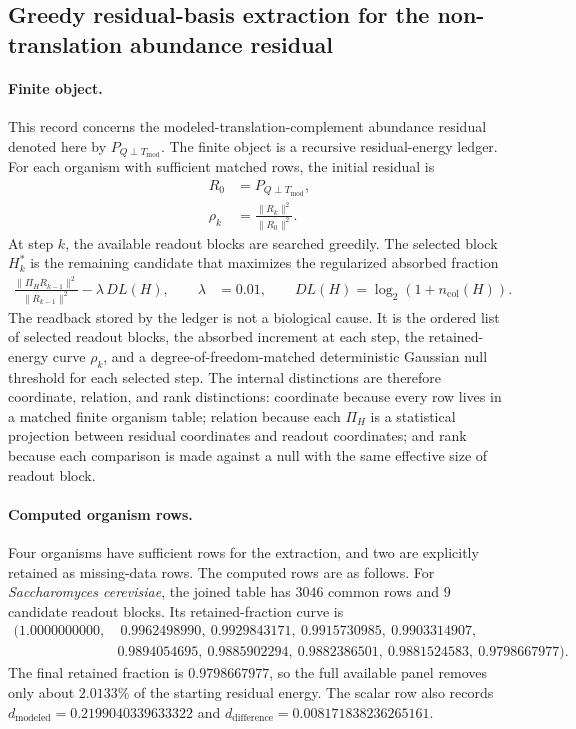 \subsection{Greedy residual-basis extraction for the non-translation abundance residual}
\label{sec:q6-residual-basis-extraction-greedy-readout-cross-layer}

\paragraph{Finite object.}
This record concerns the modeled-translation-complement abundance residual denoted here by $P_{Q\perp T_{\mathrm{mod}}}$.  The finite object is a recursive residual-energy ledger.  For each organism with sufficient matched rows, the initial residual is
$$
\begin{aligned}
R_0 &= P_{Q\perp T_{\mathrm{mod}}},\\
\rho_k &= \frac{\|R_k\|^2}{\|R_0\|^2}.
\end{aligned}
$$
At step $k$, the available readout blocks are searched greedily.  The selected block $H_k^*$ is the remaining candidate that maximizes the regularized absorbed fraction
$$
\begin{aligned}
\frac{\|\Pi_H R_{k-1}\|^2}{\|R_{k-1}\|^2} - \lambda\,DL(H),
\qquad
\lambda &= 0.01,
\qquad
DL(H)=\log_2(1+n_{\mathrm{col}}(H)).
\end{aligned}
$$
The readback stored by the ledger is not a biological cause.  It is the ordered list of selected readout blocks, the absorbed increment at each step, the retained-energy curve $\rho_k$, and a degree-of-freedom-matched deterministic Gaussian null threshold for each selected step.  The internal distinctions are therefore coordinate, relation, and rank distinctions: coordinate because every row lives in a matched finite organism table; relation because each $\Pi_H$ is a statistical projection between residual coordinates and readout coordinates; and rank because each comparison is made against a null with the same effective size of readout block.

\paragraph{Computed organism rows.}
Four organisms have sufficient rows for the extraction, and two are explicitly retained as missing-data rows.  The computed rows are as follows.  For \emph{Saccharomyces cerevisiae}, the joined table has $3046$ common rows and $9$ candidate readout blocks.  Its retained-fraction curve is
$$
\begin{aligned}
(1.0000000000,&\ 0.9962498990,\ 0.9929843171,\ 0.9915730985,\ 0.9903314907,\\
&0.9894054695,\ 0.9885902294,\ 0.9882386501,\ 0.9881524583,\ 0.9798667977).
\end{aligned}
$$
The final retained fraction is $0.9798667977$, so the full available panel removes only about $2.0133\%$ of the starting residual energy.  The scalar row also records $d_{\mathrm{modeled}}=0.2199040339633322$ and $d_{\mathrm{difference}}=0.008171838236265161$.

